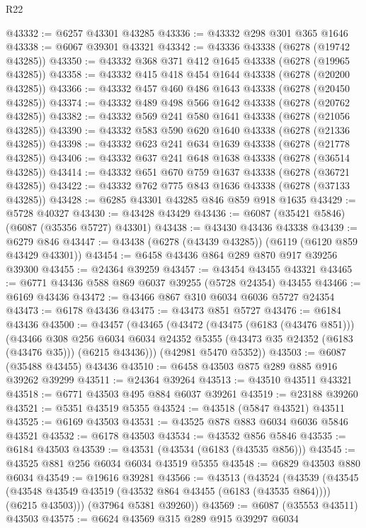 \begin{lexlean}{R22}
\begin{coremodule}
@43332 := @6257 @43301 @43285
@43336 := @43332 @298 @301 @365 @1646
@43338 := @6067 @39301 @43321
@43342 := @43336 @43338 (@6278 (@19742 @43285))
@43350 := @43332 @368 @371 @412 @1645 @43338 (@6278 (@19965 @43285))
@43358 := @43332 @415 @418 @454 @1644 @43338 (@6278 (@20200 @43285))
@43366 := @43332 @457 @460 @486 @1643 @43338 (@6278 (@20450 @43285))
@43374 := @43332 @489 @498 @566 @1642 @43338 (@6278 (@20762 @43285))
@43382 := @43332 @569 @241 @580 @1641 @43338 (@6278 (@21056 @43285))
@43390 := @43332 @583 @590 @620 @1640 @43338 (@6278 (@21336 @43285))
@43398 := @43332 @623 @241 @634 @1639 @43338 (@6278 (@21778 @43285))
@43406 := @43332 @637 @241 @648 @1638 @43338 (@6278 (@36514 @43285))
@43414 := @43332 @651 @670 @759 @1637 @43338 (@6278 (@36721 @43285))
@43422 := @43332 @762 @775 @843 @1636 @43338 (@6278 (@37133 @43285))
@43428 := @6285 @43301 @43285 @846 @859 @918 @1635
@43429 := @5728 @40327
@43430 := @43428 @43429
@43436 := @6087 (@35421 @5846) (@6087 (@35356 @5727) @43301)
@43438 := @43430 @43436 @43338
@43439 := @6279 @846
@43447 := @43438 (@6278 (@43439 @43285)) (@6119 (@6120 @859 @43429 @43301))
@43454 := @6458 @43436 @864 @289 @870 @917 @39256 @39300
@43455 := @24364 @39259
@43457 := @43454 @43455 @43321
@43465 := @6771 @43436 @588 @869 @6037 @39255 (@5728 @24354) @43455
@43466 := @6169 @43436
@43472 := @43466 @867 @310 @6034 @6036 @5727 @24354
@43473 := @6178 @43436
@43475 := @43473 @851 @5727
@43476 := @6184 @43436
@43500 := @43457
    (@43465
      (@43472
        (@43475 (@6183 (@43476 @851)))
        (@43466
          @308
          @256
          @6034
          @6034
          @24352
          @5355
          (@43473 @35 @24352 (@6183 (@43476 @35)))
          (@6215 @43436)))
      (@42981 @5470 @5352))
@43503 := @6087 (@35488 @43455) @43436
@43510 := @6458 @43503 @875 @289 @885 @916 @39262 @39299
@43511 := @24364 @39264
@43513 := @43510 @43511 @43321
@43518 := @6771 @43503 @495 @884 @6037 @39261
@43519 := @23188 @39260
@43521 := @5351 @43519 @5355
@43524 := @43518 (@5847 @43521) @43511
@43525 := @6169 @43503
@43531 := @43525 @878 @883 @6034 @6036 @5846 @43521
@43532 := @6178 @43503
@43534 := @43532 @856 @5846
@43535 := @6184 @43503
@43539 := @43531 (@43534 (@6183 (@43535 @856)))
@43545 := @43525 @881 @256 @6034 @6034 @43519 @5355
@43548 := @6829 @43503 @880 @6034
@43549 := @19616 @39281
@43566 := @43513
    (@43524
      (@43539
        (@43545 (@43548 @43549 @43519 (@43532 @864 @43455 (@6183 (@43535 @864)))) (@6215 @43503)))
      (@37964 @5381 @39260))
@43569 := @6087 (@35553 @43511) @43503
@43575 := @6624 @43569 @315 @289 @915 @39297 @6034

\end{coremodule}
\end{lexlean}
